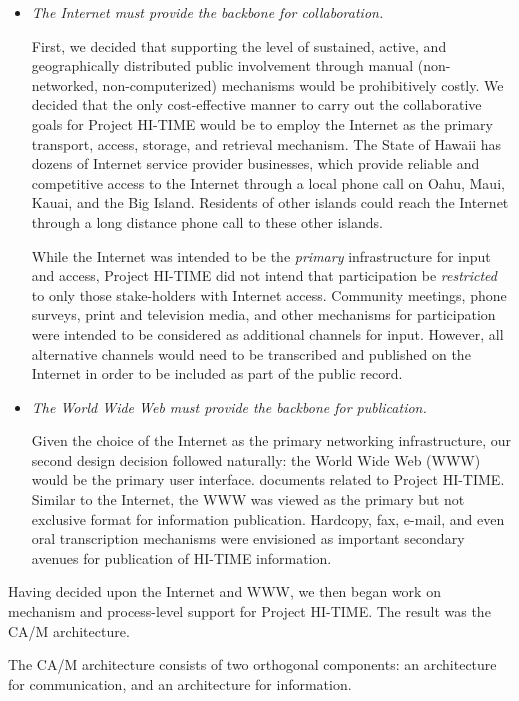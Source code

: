 \begin{itemize}
\item {\em The Internet must provide the backbone for collaboration.}

  First, we decided that supporting the level of sustained, active, and
  geographically distributed public involvement through manual
  (non-networked, non-computerized) mechanisms would be prohibitively
  costly.  We decided that the only cost-effective manner to carry out
  the collaborative goals for Project HI-TIME would be to employ the
  Internet as the primary transport, access, storage, and retrieval
  mechanism. The State of Hawaii has dozens of 
  Internet service provider businesses, which provide reliable and
  competitive access to the Internet through a local phone call on Oahu,
  Maui, Kauai, and the Big Island. Residents of other islands could reach
  the Internet through a long distance phone call to these other islands.

  While the Internet was intended to be the {\em primary} infrastructure for input
  and access, Project HI-TIME did not intend that
  participation be {\em restricted} to only
  those stake-holders with Internet access.  Community meetings, phone
  surveys, print and television media, and other mechanisms for
  participation were intended to be considered as additional channels for
  input.  However, all alternative channels would need to be transcribed 
  and published on the Internet in order to be included as part of the
  public record.

\item {\em The World Wide Web must provide the backbone for publication.}

  Given the choice of the Internet as the primary networking
  infrastructure, our second design decision followed naturally: the
  World Wide Web (WWW) would be the primary user interface.  documents
  related to Project HI-TIME.  Similar to the Internet, the WWW was
  viewed as the primary but not exclusive format for information
  publication. Hardcopy, fax, e-mail, and even oral transcription
  mechanisms were envisioned as important secondary avenues for
  publication of HI-TIME information.

\end{itemize}

Having decided upon the Internet and WWW, we then began work on 
mechanism and process-level support for Project HI-TIME. The result
was the CA/M architecture. 


The CA/M architecture consists of two orthogonal components: an architecture
for communication, and an architecture for information.  


